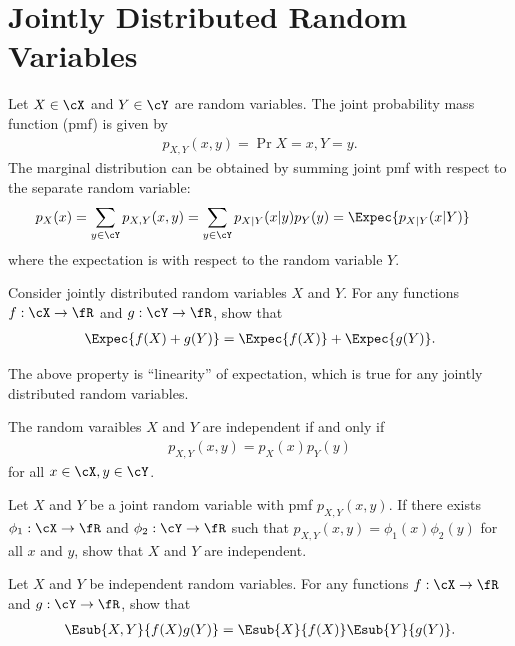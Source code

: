 \documentclass{article}
\begin{document}
\section{Jointly Distributed Random Variables}
Let $X\in \cX$ and $Y\in \cY$ are random variables.
The joint probability mass function (pmf) is given by
\begin{align}
    p_{X, Y} (x, y) = \Pr{X=x, Y=y}.
\end{align}
The marginal distribution can be obtained by summing joint pmf with respect to the separate random variable:
\begin{align}
    p_X(x) &= \sum_{y\in\cY} p_{X,Y}(x, y) = \sum_{y\in \cY} p_{X|Y}(x|y)p_Y(y) = \Expec{p_{X|Y}(x|Y)}
\end{align}
where the expectation is with respect to the random variable $Y$.

\begin{exercise}
    Consider jointly distributed random variables $X$ and $Y$. 
    For any functions $f:\cX\rightarrow \fR$ and $g:\cY\rightarrow \fR$, show that
    \begin{align}
        \Expec{f(X) + g(Y)} = \Expec{f(X)}  + \Expec{g(Y)}.
    \end{align}
\end{exercise}
The above property is ``linearity'' of expectation, which is true for any jointly distributed random variables.

\begin{definition}
    The random varaibles $X$ and $Y$ are independent if and only if
    \begin{align}
        p_{X,Y}(x, y) = p_X(x) p_Y(y)
    \end{align}
    for all $x\in\cX, y\in\cY$.
\end{definition}

\begin{exercise}
    Let $X$ and $Y$ be a joint random variable with pmf $p_{X, Y}(x, y)$.
    If there exists $\phi_1:\cX\rightarrow \fR$ and $\phi_2:\cY\rightarrow \fR$ such that $p_{X, Y}(x, y) = \phi_1(x) \phi_2(y)$ for all $x$ and $y$,
    show that $X$ and $Y$ are independent.
\end{exercise}

\begin{exercise}
    Let $X$ and $Y$ be independent random variables.
    For any functions $f:\cX\rightarrow \fR$ and $g:\cY\rightarrow \fR$, show that
    \begin{align}
        \Esub{X, Y}{f(X) g(Y)} = \Esub{X}{f(X)}  \Esub{Y}{g(Y)}.
    \end{align}
\end{exercise}
\end{document}
